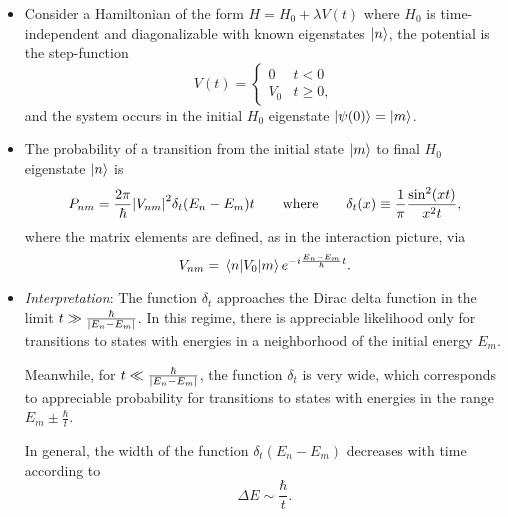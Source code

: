 \documentclass[11pt, a4paper]{article}
\newcommand{\Ham}{Hamiltonian\xspace}
\begin{document}
\begin{itemize}

    \item Consider a \Ham of the form $ H = H_{0} + \lambda V(t) $ where $ H_{0} $ is time-independent and diagonalizable with known eigenstates $ \ket{n} $, the potential is the step-function
    \begin{equation*}
        V(t) = 
        \begin{cases}
            0 & t < 0\\
            V_{0} & t \geq 0,
        \end{cases}
    \end{equation*}
    and the system occurs in the initial $ H_{0} $ eigenstate $ \ket{\psi(0)} = \ket{m} $.

    \item The probability of a transition from the initial state $ \ket{m} $ to final $ H_{0} $ eigenstate $ \ket{n} $ is
    \begin{equation*}
        P_{nm} = \frac{2\pi}{\hbar}\abs{V_{nm}}^{2} \delta_{t}(E_{n} - E_{m})t \qquad \text{where} \qquad \delta_{t}(x) \equiv \frac{1}{\pi} \frac{\sin^{2}(xt)}{x^{2}t},
    \end{equation*}
    where the matrix elements are defined, as in the interaction picture, via
    \begin{equation*}
        V_{nm} = \mel{n}{V_{0}}{m} e^{-i \frac{E_{n} - E_{m}}{\hbar}t}.
    \end{equation*}
    
    \item \textit{Interpretation}: The function $ \delta_{t} $ approaches the Dirac delta function in the limit $ t \gg \frac{\hbar}{\abs{E_{n} - E_{m}}} $. In this regime, there is appreciable likelihood only for transitions to states with energies in a neighborhood of the initial energy $ E_{m} $.

    Meanwhile, for $  t \ll \frac{\hbar}{\abs{E_{n} - E_{m}}}  $, the function $ \delta_{t} $ is very wide, which corresponds to appreciable probability for transitions to states with energies in the range $ E_{m} \pm \frac{\hbar}{t} $.

    In general, the width of the function $ \delta_{t}(E_{n} - E_{m}) $ decreases with time according to
    \begin{equation*}
        \Delta E \sim \frac{\hbar}{t}.
    \end{equation*}


\end{itemize}
\end{document}
